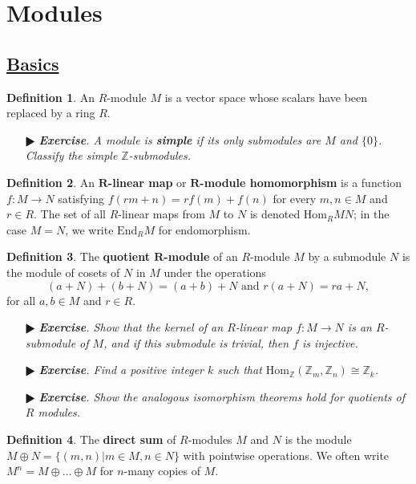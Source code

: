 \documentclass[11pt]{amsart}
\theoremstyle{definition}
\newtheorem*{definition*}{Definition}
\renewcommand\:{\colon}
\newcommand{\Z}{\mathds{Z}}
\newcommand{\1}{\mathds{1}}
\newcommand{\End}{\text{End}}
\newcommand{\Hom}{\text{Hom}}
\newcommand{\exc}[1]{\vspace{-2.5pt}\begin{itemize}[leftmargin=15pt]\item[$\RHD$] \textit{\textbf{Exercise}. #1}\end{itemize}}
\begin{document}
\clearpage









\section{Modules}

\subsection*{\underline{Basics}}

\begin{definition*}
	An $R$-module $M$ is a vector space whose scalars have been replaced by a ring $R$.
\end{definition*}

\exc{A module is \textbf{\textit{simple}} if its only submodules are $M$ and $\{0\}$. Classify the simple $\Z$-submodules.}

\begin{definition*}
	An \textbf{$\boldsymbol{R}$-linear map} or \textbf{$\boldsymbol{R}$-module homomorphism} is a function $f\: M \to N$ satisfying $f(rm + n) = rf(m) + f(n)$ for every $m, n \in M$ and $r \in R$. The set of all $R$-linear maps from $M$ to $N$ is denoted $\Hom_R MN$; in the case $M = N$, we write $\End_R M$ for endomorphism.
\end{definition*}

\begin{definition*}
	The \textbf{quotient $\boldsymbol{R}$-module} of an $R$-module $M$ by a submodule $N$ is the module of cosets of $N$ in $M$ under the operations
		\[ (a + N) + (b + N) = (a + b) + N \text{ and } r(a + N) = ra + N, \]
	for all $a, b \in M$ and $r \in R$.
\end{definition*}

\exc{Show that the kernel of an $R$-linear map $f\: M \to N$ is an $R$-submodule of $M$, and if this submodule is trivial, then $f$ is injective.}
\exc{Find a positive integer $k$ such that $\Hom_\Z(\Z_m, \Z_n) \cong \Z_k$.}
\exc{Show the analogous isomorphism theorems hold for quotients of $R$ modules.}

\begin{definition*}
	The \textbf{direct sum} of $R$-modules $M$ and $N$ is the module $M \oplus N = \{(m, n) | m \in M, n \in N\}$ with pointwise operations. We often write $M^n = M \oplus \dots \oplus M$ for $n$-many copies of $M$.
\end{definition*}
\end{document}
